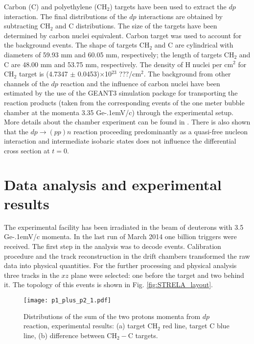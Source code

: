 \documentclass[twocolumn,epjc3]{svjour3}
\newcommand{\dpchex} {\ensuremath{dp \rightarrow (pp)n}\xspace}
\newcommand{\GeVc}   {Ge\kern-.1emV/c\xspace}
\begin{document}
Carbon (C) and polyethylene (CH$_2$) targets have been used to extract the $dp$
interaction. The final distributions of the $dp$ interactions are obtained by
subtracting CH$_2$ and C distributions. The size of the targets have been
determined by carbon nuclei equivalent. Carbon target was used to account for
the background events. The shape of targets CH$_2$ and C are cylindrical with
diameters of 59.93 mm and 60.05 mm, respectively; the length of targets CH$_2$
and C are 48.00 mm and 53.75 mm, respectively. The density of H nuclei per
cm$^2$ for CH$_2$ target is (4.7347 $\pm$ 0.0453)$\times$10$^{23}$ ???/cm$^2$.
The background from other channels of the $dp$ reaction and the influence of
carbon nuclei have been estimated by the use of the GEANT3 simulation package
for transporting the reaction products (taken from the corresponding events of
the one meter bubble chamber at the momenta 3.35 \GeVc) through the experimental
setup. More details about the chamber experiment can be found in
\cite{gla02,gla08}. There is also shown that the \dpchex reaction proceeding
predominantly as a quasi-free nucleon interaction and intermediate isobaric
states does not influence the differential cross section at $t = 0$.

\section{Data analysis and experimental results}
The experimental facility has been irradiated in the beam of deuterons with 3.5
\GeVc momenta. In the last run of March 2014 one billion triggers were received.
The first step in the analysis was to decode events. Calibration procedure and
the track reconstruction in the drift chambers transformed the raw data into
physical quantities. For the further processing and physical analysis three
tracks in the $xz$ plane were selected: one before the target and two behind it.
The topology of this events is shown in Fig. \ref{fig:STRELA_layout}.

\begin{figure}[h]
  \centering
  \texttt{[image: p1\_plus\_p2\_1.pdf]}
  \caption{Distributions of the sum of the two protons momenta from $dp$
    reaction, experimental results: (a) target CH$_2$ red line, target C blue
    line, (b) difference between CH$_2-$C targets.}
  \label{fig:p1p2exp}
\end{figure}
\end{document}
